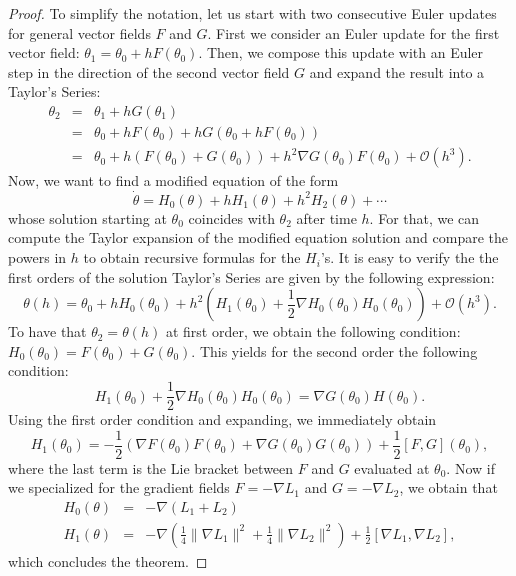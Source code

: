 \documentclass{article}
\begin{document}
\begin{proof}
To simplify the notation, let us start with two consecutive Euler updates for general vector fields $F$ and $G$. First we consider an Euler update for the first vector field: $\theta_1 = \theta_0 + h F(\theta_0)$. Then, we compose this update with an Euler step in the direction of the second vector field $G$ and expand the result into a Taylor's Series:
\begin{eqnarray*}
\theta_2 
& = & \theta_1 + h G(\theta_1) \\
& = & \theta_0 + h F(\theta_0)  + h G(\theta_0 + h F(\theta_0))\\
& = & \theta_0 + h (F(\theta_0) + G(\theta_0)) + h^2 \nabla G(\theta_0)F(\theta_0) + \mathcal O(h^3).
\end{eqnarray*}
Now, we want to find a modified equation of the form
\begin{equation}
    \dot \theta = H_0(\theta) + h H_1(\theta) + h^2 H_2(\theta) + \cdots 
\end{equation}
whose solution starting at $\theta_0$ coincides with $\theta_2$ after time $h$. For that, we can compute the Taylor expansion of the modified equation solution and compare the powers in $h$ to obtain recursive formulas for the $H_i$'s. It is easy to verify the the first orders of the solution Taylor's Series are given by the following expression:
\begin{equation}
    \theta(h) = \theta_0 + h H_0(\theta_0) + h^2(H_1(\theta_0) + \frac12 \nabla H_0(\theta_0) H_0(\theta_0)) + \mathcal O (h^3).
\end{equation}
To have that $\theta_2 = \theta(h)$ at first order, we obtain the following condition: $H_0(\theta_0) = F(\theta_0) + G(\theta_0)$. This yields for the second order the following condition:
\begin{equation}
    H_1(\theta_0) + \frac12 \nabla H_0(\theta_0) H_0(\theta_0) = \nabla G(\theta_0) H(\theta_0).
\end{equation}
Using the first order condition and expanding, we immediately obtain
\begin{equation}
    H_1(\theta_0) = -\frac12\left(\nabla F(\theta_0) F(\theta_0) + \nabla G(\theta_0) G(\theta_0)\right) + \frac12[F, G](\theta_0),
\end{equation}
where the last term is the Lie bracket between $F$ and $G$ evaluated at $\theta_0$. Now if we specialized for the gradient fields $F = - \nabla L_1$ and $G = - \nabla L_2$, we obtain that
\begin{eqnarray}
H_0(\theta) & = & -\nabla(L_1 + L_2) \\
H_1(\theta) & = & -\nabla \left(\frac 14 \|\nabla L_1\|^2 + \frac 14 \|\nabla L_2\|^2\right) + \frac 12 [\nabla L_1, \nabla L_2],
\end{eqnarray}
which concludes the theorem. 
\end{proof}
\end{document}
